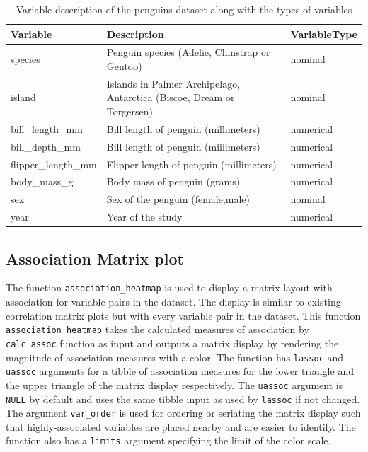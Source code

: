 \begin{Schunk}
\begin{table}

\caption{\label{tab:penguins}Variable description of the penguins dataset along with the types of variables}
\centering
\begin{tabular}[t]{lll}
\toprule
Variable & Description & VariableType\\
\midrule
species & Penguin species (Adelie, Chinstrap or Gentoo) & nominal\\
island & Islands in Palmer Archipelago, Antarctica (Biscoe, Dream or Torgersen) & nominal\\
bill\_length\_mm & Bill length of penguin (millimeters) & numerical\\
bill\_depth\_mm & Bill length of penguin (millimeters) & numerical\\
flipper\_length\_mm & Flipper length of penguin (millimeters) & numerical\\
\addlinespace
body\_mass\_g & Body mass of penguin (grams) & numerical\\
sex & Sex of the penguin (female,male) & nominal\\
year & Year of the study & numerical\\
\bottomrule
\end{tabular}
\end{table}

\end{Schunk}

\hypertarget{association-matrix-plot}{%
\subsection{Association Matrix plot}\label{association-matrix-plot}}

The function \texttt{association\_heatmap} is used to display a matrix
layout with association for variable pairs in the dataset. The display
is similar to existing correlation matrix plots but with every variable
pair in the dataset. This function \texttt{association\_heatmap} takes
the calculated measures of association by \texttt{calc\_assoc} function
as input and outputs a matrix display by rendering the magnitude of
association measures with a color. The function has \texttt{lassoc} and
\texttt{uassoc} arguments for a tibble of association measures for the
lower triangle and the upper triangle of the matrix display
respectively. The \texttt{uassoc} argument is \texttt{NULL} by default
and uses the same tibble input as used by \texttt{lassoc} if not
changed. The argument \texttt{var\_order} is used for ordering or
seriating the matrix display such that highly-associated variables are
placed nearby and are easier to identify. The function also has a
\texttt{limits} argument specifying the limit of the color scale.


